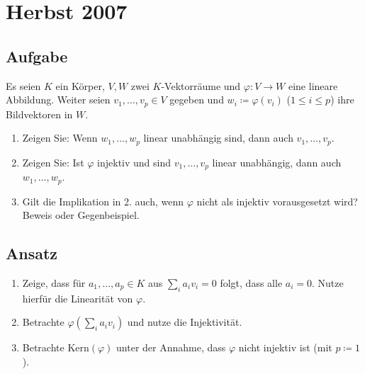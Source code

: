 \newpage

\section{Herbst 2007}

\subsection{Aufgabe}
Es seien \( K \) ein Körper, \( V, W \) zwei \( K \)-Vektorräume und \( \varphi: V \to W \) eine lineare Abbildung. Weiter seien \( v_1, \dots, v_p \in V \) gegeben und \( w_i \coloneqq \varphi(v_i) \) (\( 1 \leq i \leq p \)) ihre Bildvektoren in \( W \).
\begin{enumerate}
	\item Zeigen Sie: Wenn \( w_1, \dots, w_p \) linear unabhängig sind, dann auch \( v_1, \dots, v_p \).
	\item Zeigen Sie: Ist \( \varphi \) injektiv und sind \( v_1, \dots, v_p \) linear unabhängig, dann auch \( w_1, \dots, w_p \).
	\item Gilt die Implikation in 2. auch, wenn \( \varphi \) nicht als injektiv vorausgesetzt wird? Beweis oder Gegenbeispiel. 
\end{enumerate}

\subsection{Ansatz}
\begin{enumerate}
	\item Zeige, dass für \( a_1, \dots, a_p \in K \) aus \( \sum_i a_iv_i = 0 \) folgt, dass alle \( a_i = 0 \). Nutze hierfür die Linearität von \( \varphi \).
	\item Betrachte \( \varphi \left( \sum_i a_iv_i \right) \) und nutze die Injektivität.
	\item Betrachte \( \text{Kern}(\varphi) \) unter der Annahme, dass \( \varphi \) nicht injektiv ist (mit \( p \coloneqq 1 \)).
\end{enumerate}


